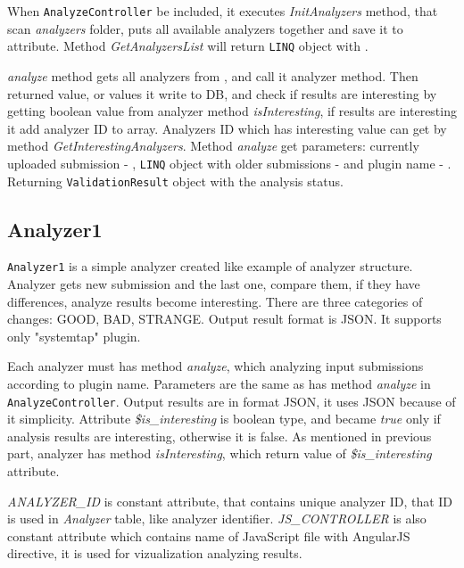 When \texttt{AnalyzeController} be included, it executes \emph{InitAnalyzers} method, that scan \emph{analyzers} folder, puts all available analyzers together and save it to \emph{} attribute. Method \emph{GetAnalyzersList} will return \texttt{LINQ} object with \emph{}.

\emph{analyze} method gets all analyzers from \emph{}, and call it analyzer method. Then returned value, or values it write to DB, and check if results are interesting by getting boolean value from analyzer method \emph{isInteresting}, if results are interesting it add analyzer ID to \emph{} array. Analyzers ID which has interesting value can get by method \emph{GetInterestingAnalyzers}. Method \emph{analyze} get parameters: currently uploaded submission - \emph{}, \texttt{LINQ} object with older submissions - \emph{} and plugin name - \emph{}. Returning \texttt{ValidationResult} object with the analysis status.

\subsection{Analyzer1}

\texttt{Analyzer1} is a simple analyzer created like example of analyzer structure. Analyzer gets new submission and the last one, compare them, if they have differences, analyze results become interesting. There are three categories of changes: GOOD, BAD, STRANGE. Output result format is JSON. It supports only "systemtap" plugin.

Each analyzer must has method \emph{analyze}, which analyzing input submissions according to plugin name. Parameters are the same as has method \emph{analyze} in \texttt{AnalyzeController}. Output results are in format JSON, it uses JSON because of it simplicity. Attribute \emph{\$is\_interesting} is boolean type, and became \emph{true} only if analysis results are interesting, otherwise it is false. As mentioned in previous part, analyzer has method \emph{isInteresting}, which return value of \emph{\$is\_interesting} attribute.

\emph{ANALYZER\_ID} is constant attribute, that contains unique analyzer ID, that ID is used in \emph{Analyzer} table, like analyzer identifier. \emph{JS\_CONTROLLER} is also constant attribute which contains name of JavaScript file with AngularJS directive, it is used for vizualization analyzing results.

